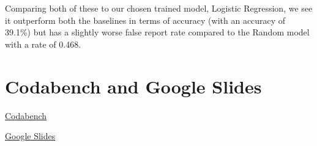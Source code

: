 \documentclass[11pt, letterpaper, notitlepage]{article}
\begin{document}
Comparing both of these to our chosen trained model, Logistic Regression, we see it outperform both the baselines in terms of accuracy (with an accuracy of 39.1\%) but has a slightly worse false report rate compared to the Random model with a rate of 0.468.

\section[4]{Codabench and Google Slides}

\href{https://www.codabench.org/competitions/6413/?secret_key=18cf17ed-e34e-4dbe-bde8-8886d5fd938f#}{Codabench}

\noindent
\href{https://docs.google.com/presentation/d/13r1v7ZJz09BcJoJHFzwneAz29XX4DrgYUD3a88opioQ/edit?usp=sharing}{Google Slides}
\end{document}
